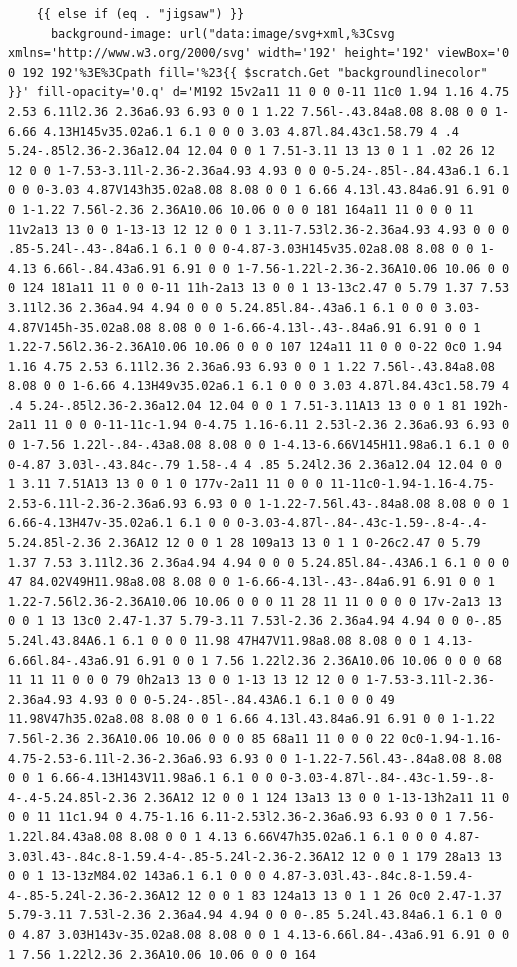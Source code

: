 \documentclass[11pt]{article}
\begin{document}
\begin{enumerate}
\begin{verbatim}
    {{ else if (eq . "jigsaw") }}
      background-image: url("data:image/svg+xml,%3Csvg xmlns='http://www.w3.org/2000/svg' width='192' height='192' viewBox='0 0 192 192'%3E%3Cpath fill='%23{{ $scratch.Get "backgroundlinecolor" }}' fill-opacity='0.q' d='M192 15v2a11 11 0 0 0-11 11c0 1.94 1.16 4.75 2.53 6.11l2.36 2.36a6.93 6.93 0 0 1 1.22 7.56l-.43.84a8.08 8.08 0 0 1-6.66 4.13H145v35.02a6.1 6.1 0 0 0 3.03 4.87l.84.43c1.58.79 4 .4 5.24-.85l2.36-2.36a12.04 12.04 0 0 1 7.51-3.11 13 13 0 1 1 .02 26 12 12 0 0 1-7.53-3.11l-2.36-2.36a4.93 4.93 0 0 0-5.24-.85l-.84.43a6.1 6.1 0 0 0-3.03 4.87V143h35.02a8.08 8.08 0 0 1 6.66 4.13l.43.84a6.91 6.91 0 0 1-1.22 7.56l-2.36 2.36A10.06 10.06 0 0 0 181 164a11 11 0 0 0 11 11v2a13 13 0 0 1-13-13 12 12 0 0 1 3.11-7.53l2.36-2.36a4.93 4.93 0 0 0 .85-5.24l-.43-.84a6.1 6.1 0 0 0-4.87-3.03H145v35.02a8.08 8.08 0 0 1-4.13 6.66l-.84.43a6.91 6.91 0 0 1-7.56-1.22l-2.36-2.36A10.06 10.06 0 0 0 124 181a11 11 0 0 0-11 11h-2a13 13 0 0 1 13-13c2.47 0 5.79 1.37 7.53 3.11l2.36 2.36a4.94 4.94 0 0 0 5.24.85l.84-.43a6.1 6.1 0 0 0 3.03-4.87V145h-35.02a8.08 8.08 0 0 1-6.66-4.13l-.43-.84a6.91 6.91 0 0 1 1.22-7.56l2.36-2.36A10.06 10.06 0 0 0 107 124a11 11 0 0 0-22 0c0 1.94 1.16 4.75 2.53 6.11l2.36 2.36a6.93 6.93 0 0 1 1.22 7.56l-.43.84a8.08 8.08 0 0 1-6.66 4.13H49v35.02a6.1 6.1 0 0 0 3.03 4.87l.84.43c1.58.79 4 .4 5.24-.85l2.36-2.36a12.04 12.04 0 0 1 7.51-3.11A13 13 0 0 1 81 192h-2a11 11 0 0 0-11-11c-1.94 0-4.75 1.16-6.11 2.53l-2.36 2.36a6.93 6.93 0 0 1-7.56 1.22l-.84-.43a8.08 8.08 0 0 1-4.13-6.66V145H11.98a6.1 6.1 0 0 0-4.87 3.03l-.43.84c-.79 1.58-.4 4 .85 5.24l2.36 2.36a12.04 12.04 0 0 1 3.11 7.51A13 13 0 0 1 0 177v-2a11 11 0 0 0 11-11c0-1.94-1.16-4.75-2.53-6.11l-2.36-2.36a6.93 6.93 0 0 1-1.22-7.56l.43-.84a8.08 8.08 0 0 1 6.66-4.13H47v-35.02a6.1 6.1 0 0 0-3.03-4.87l-.84-.43c-1.59-.8-4-.4-5.24.85l-2.36 2.36A12 12 0 0 1 28 109a13 13 0 1 1 0-26c2.47 0 5.79 1.37 7.53 3.11l2.36 2.36a4.94 4.94 0 0 0 5.24.85l.84-.43A6.1 6.1 0 0 0 47 84.02V49H11.98a8.08 8.08 0 0 1-6.66-4.13l-.43-.84a6.91 6.91 0 0 1 1.22-7.56l2.36-2.36A10.06 10.06 0 0 0 11 28 11 11 0 0 0 0 17v-2a13 13 0 0 1 13 13c0 2.47-1.37 5.79-3.11 7.53l-2.36 2.36a4.94 4.94 0 0 0-.85 5.24l.43.84A6.1 6.1 0 0 0 11.98 47H47V11.98a8.08 8.08 0 0 1 4.13-6.66l.84-.43a6.91 6.91 0 0 1 7.56 1.22l2.36 2.36A10.06 10.06 0 0 0 68 11 11 11 0 0 0 79 0h2a13 13 0 0 1-13 13 12 12 0 0 1-7.53-3.11l-2.36-2.36a4.93 4.93 0 0 0-5.24-.85l-.84.43A6.1 6.1 0 0 0 49 11.98V47h35.02a8.08 8.08 0 0 1 6.66 4.13l.43.84a6.91 6.91 0 0 1-1.22 7.56l-2.36 2.36A10.06 10.06 0 0 0 85 68a11 11 0 0 0 22 0c0-1.94-1.16-4.75-2.53-6.11l-2.36-2.36a6.93 6.93 0 0 1-1.22-7.56l.43-.84a8.08 8.08 0 0 1 6.66-4.13H143V11.98a6.1 6.1 0 0 0-3.03-4.87l-.84-.43c-1.59-.8-4-.4-5.24.85l-2.36 2.36A12 12 0 0 1 124 13a13 13 0 0 1-13-13h2a11 11 0 0 0 11 11c1.94 0 4.75-1.16 6.11-2.53l2.36-2.36a6.93 6.93 0 0 1 7.56-1.22l.84.43a8.08 8.08 0 0 1 4.13 6.66V47h35.02a6.1 6.1 0 0 0 4.87-3.03l.43-.84c.8-1.59.4-4-.85-5.24l-2.36-2.36A12 12 0 0 1 179 28a13 13 0 0 1 13-13zM84.02 143a6.1 6.1 0 0 0 4.87-3.03l.43-.84c.8-1.59.4-4-.85-5.24l-2.36-2.36A12 12 0 0 1 83 124a13 13 0 1 1 26 0c0 2.47-1.37 5.79-3.11 7.53l-2.36 2.36a4.94 4.94 0 0 0-.85 5.24l.43.84a6.1 6.1 0 0 0 4.87 3.03H143v-35.02a8.08 8.08 0 0 1 4.13-6.66l.84-.43a6.91 6.91 0 0 1 7.56 1.22l2.36 2.36A10.06 10.06 0 0 0 164 
\end{verbatim}
\end{enumerate}
\end{document}
